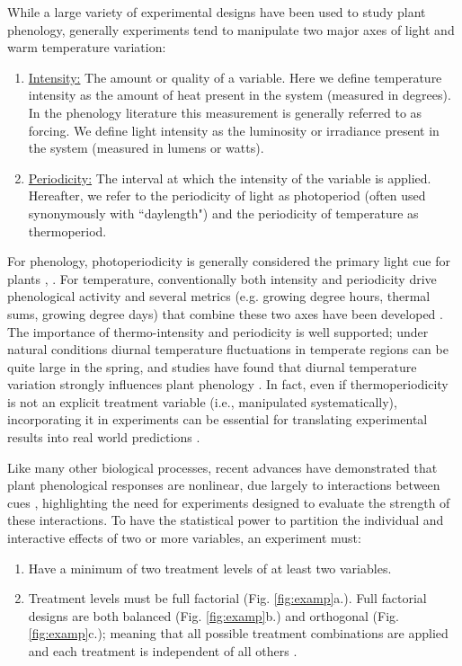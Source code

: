 \documentclass[11pt]{article}
\begin{document}
While a large variety of experimental designs have been used to study plant phenology, generally experiments tend to manipulate two major axes of light and warm temperature variation:
\begin{enumerate}
\item \underline{Intensity:} The amount or quality of a variable. Here we define temperature intensity as the amount of heat present in the system (measured in degrees). In the phenology literature this measurement is generally referred to as forcing. We define light intensity as the luminosity or irradiance present in the system (measured in lumens or watts). 
\item \underline{Periodicity:} The interval at which the intensity of the variable is applied. Hereafter, we refer to the periodicity of light as photoperiod (often used synonymously with ``daylength") and the periodicity of temperature as thermoperiod. 
\end{enumerate}
For phenology, photoperiodicity is generally considered the primary light cue for plants \citep{WAY:2015aa}, \citep[though regarding light intensity and phenology see][]{Brelsford2018,Cober1996}. For temperature, conventionally both intensity and periodicity drive phenological activity and several metrics (e.g. growing degree hours, thermal sums, growing degree days)  that combine these two axes have been developed \citep{Gu:2016wa}. The importance of thermo-intensity and periodicity is well supported; under natural conditions diurnal temperature fluctuations in temperate regions can be quite large in the spring, and studies have found that diurnal temperature variation strongly influences plant phenology \citep{Burghardt:2016uy}. In fact, even if thermoperiodicity is not an explicit treatment variable (i.e., manipulated systematically), incorporating it in experiments can be essential for translating experimental results into real world predictions \citep{plants9101312}.

Like many other biological processes, recent advances have demonstrated that plant phenological responses are nonlinear, due largely to interactions between cues \citep{Wolkovich:2022ue,fu2015}, highlighting the need for experiments designed to evaluate the strength of these interactions. To have the statistical power to partition the individual and interactive effects of two or more variables, an experiment must:
\begin{enumerate}
\item Have a minimum of two treatment levels of at least two variables.
\item Treatment levels must be full factorial (Fig. \ref{fig:examp}a.). Full factorial designs are both balanced (Fig. \ref{fig:examp}b.)  and orthogonal (Fig. \ref{fig:examp}c.); meaning that all possible treatment combinations are applied and each treatment is independent of all others \citep{cheng2016}.
\end{enumerate}
\end{document}
